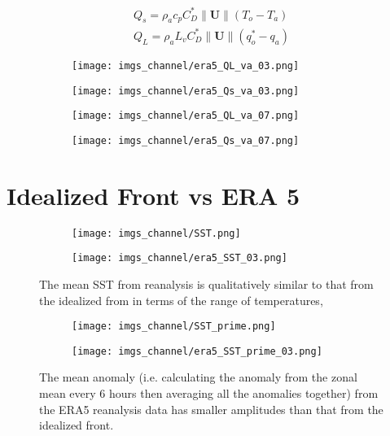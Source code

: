 \documentclass[12pt,a4paper]{article}
\newcommand{\Vmag}[1]{\| \mathbf{#1}\|}
\begin{document}
\begin{align}
Q_s = \rho_a c_p  C_D^* \Vmag{U} (T_o-T_a)\\
Q_L = \rho_a L_v  C_D^* \Vmag{U} (q_o^*-q_a)
\end{align}


\begin{figure}[h!]
\centering
\begin{subfigure}[t]{0.49\textwidth}
\texttt{[image: imgs\_channel/era5\_QL\_va\_03.png]}
\end{subfigure}
\begin{subfigure}[t]{0.49\textwidth}
\texttt{[image: imgs\_channel/era5\_Qs\_va\_03.png]}
\end{subfigure}
\end{figure}


\begin{figure}[h!]
\centering
\begin{subfigure}[t]{0.49\textwidth}
\texttt{[image: imgs\_channel/era5\_QL\_va\_07.png]}
\end{subfigure}
\begin{subfigure}[t]{0.49\textwidth}
\texttt{[image: imgs\_channel/era5\_Qs\_va\_07.png]}
\end{subfigure}
\end{figure}


\section{Idealized Front vs ERA 5}

\begin{figure}[h!]
\centering
\begin{subfigure}[t]{0.49\textwidth}
\texttt{[image: imgs\_channel/SST.png]}
\end{subfigure}
\begin{subfigure}[t]{0.49\textwidth}
\texttt{[image: imgs\_channel/era5\_SST\_03.png]}
\end{subfigure}
\caption{The mean SST from reanalysis is qualitatively similar to that from the idealized from in terms of the range of temperatures, }
\end{figure}

\begin{figure}[h!]
\centering
\begin{subfigure}[t]{0.49\textwidth}
\texttt{[image: imgs\_channel/SST\_prime.png]}
\end{subfigure}
\begin{subfigure}[t]{0.49\textwidth}
\texttt{[image: imgs\_channel/era5\_SST\_prime\_03.png]}
\end{subfigure}
\caption{The mean anomaly (i.e. calculating the anomaly from the zonal mean every 6 hours then averaging all the anomalies together) from the ERA5 reanalysis data has smaller amplitudes than that from the idealized front.}
\end{figure}
\end{document}
